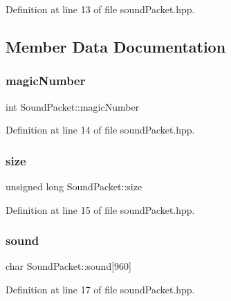 Definition at line 13 of file sound\+Packet.\+hpp.



\subsection{Member Data Documentation}
\mbox{\label{struct_sound_packet_a3847f18db4f82ef66b4823e19a9436ee}} 
\subsubsection{\texorpdfstring{magic\+Number}{magicNumber}}
{\footnotesize\ttfamily int Sound\+Packet\+::magic\+Number}



Definition at line 14 of file sound\+Packet.\+hpp.

\mbox{\label{struct_sound_packet_a47ab19973aebdbb8cec71c03fc61ec9b}} 
\subsubsection{\texorpdfstring{size}{size}}
{\footnotesize\ttfamily unsigned long Sound\+Packet\+::size}



Definition at line 15 of file sound\+Packet.\+hpp.

\mbox{\label{struct_sound_packet_a09f457e6f2623e33c1eb6b38b67f7a75}} 
\subsubsection{\texorpdfstring{sound}{sound}}
{\footnotesize\ttfamily char Sound\+Packet\+::sound\mbox{[}960\mbox{]}}



Definition at line 17 of file sound\+Packet.\+hpp.

\mbox{\label{struct_sound_packet_a7db1b25b84d9bfc40055b70e944cbc93}} 
